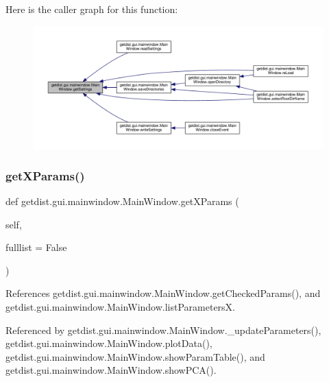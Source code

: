 Here is the caller graph for this function\+:
\nopagebreak
\begin{figure}[H]
\begin{center}
\leavevmode
\includegraphics[width=350pt]{classgetdist_1_1gui_1_1mainwindow_1_1MainWindow_a3b46ccf380b69cea6f4f95ba9ec4ed4d_icgraph}
\end{center}
\end{figure}
\mbox{\label{classgetdist_1_1gui_1_1mainwindow_1_1MainWindow_a9f988a9217e030de892f370248a94481}} 
\subsubsection{\texorpdfstring{get\+X\+Params()}{getXParams()}}
{\footnotesize\ttfamily def getdist.\+gui.\+mainwindow.\+Main\+Window.\+get\+X\+Params (\begin{DoxyParamCaption}\item[{}]{self,  }\item[{}]{fulllist = {\ttfamily False} }\end{DoxyParamCaption})}



References getdist.\+gui.\+mainwindow.\+Main\+Window.\+get\+Checked\+Params(), and getdist.\+gui.\+mainwindow.\+Main\+Window.\+list\+ParametersX.



Referenced by getdist.\+gui.\+mainwindow.\+Main\+Window.\+\_\+update\+Parameters(), getdist.\+gui.\+mainwindow.\+Main\+Window.\+plot\+Data(), getdist.\+gui.\+mainwindow.\+Main\+Window.\+show\+Param\+Table(), and getdist.\+gui.\+mainwindow.\+Main\+Window.\+show\+P\+C\+A().

